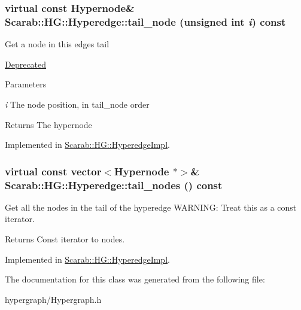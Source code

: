 \hypertarget{class_scarab_1_1_h_g_1_1_hyperedge_a9ec8cf9ea7b5f762f359a6f9f1c038da}{
\subsubsection[{tail\_\-node}]{\setlength{\rightskip}{0pt plus 5cm}virtual const {\bf Hypernode}\& Scarab::HG::Hyperedge::tail\_\-node (unsigned int {\em i}) const}}
\label{class_scarab_1_1_h_g_1_1_hyperedge_a9ec8cf9ea7b5f762f359a6f9f1c038da}
Get a node in this edges tail \begin{Desc}
\item[\hyperlink{deprecated__deprecated000003}{Deprecated}]\end{Desc}

\begin{DoxyParams}{Parameters}
\item[{\em i}]The node position, in tail\_\-node order\end{DoxyParams}
\begin{DoxyReturn}{Returns}
The hypernode 
\end{DoxyReturn}


Implemented in \hyperlink{class_scarab_1_1_h_g_1_1_hyperedge_impl_a7087ba121f3056eb5946d1909c4b3d58}{Scarab::HG::HyperedgeImpl}.

\hypertarget{class_scarab_1_1_h_g_1_1_hyperedge_abac6d27691186608aa12949de6e1c283}{
\subsubsection[{tail\_\-nodes}]{\setlength{\rightskip}{0pt plus 5cm}virtual const vector$<${\bf Hypernode} $\ast$$>$\& Scarab::HG::Hyperedge::tail\_\-nodes () const}}
\label{class_scarab_1_1_h_g_1_1_hyperedge_abac6d27691186608aa12949de6e1c283}
Get all the nodes in the tail of the hyperedge WARNING: Treat this as a const iterator. \begin{DoxyReturn}{Returns}
Const iterator to nodes. 
\end{DoxyReturn}


Implemented in \hyperlink{class_scarab_1_1_h_g_1_1_hyperedge_impl_a3bf00c8c032397150f59e196aea5e245}{Scarab::HG::HyperedgeImpl}.



The documentation for this class was generated from the following file:\begin{DoxyCompactItemize}
\item 
hypergraph/Hypergraph.h\end{DoxyCompactItemize}
